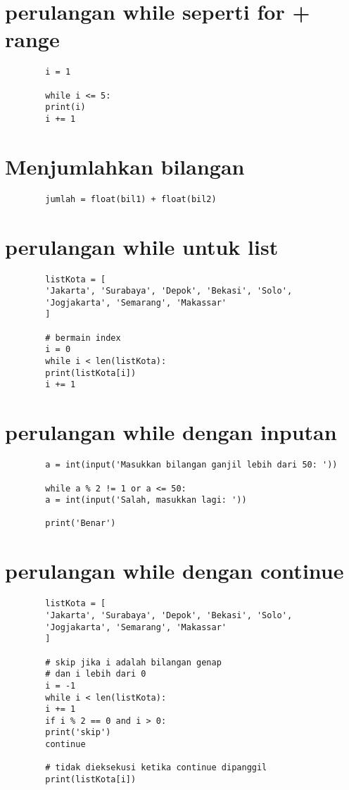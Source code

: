 \documentclass{article}
\begin{document}
	\section {perulangan while seperti for + range}
	\begin{lstlisting}
		i = 1
		
		while i <= 5:
		print(i)
		i += 1
	\end{lstlisting}

	\section {Menjumlahkan bilangan}
	\begin{lstlisting}
		jumlah = float(bil1) + float(bil2)
	\end{lstlisting}
	
	\section {perulangan while untuk list}
	\begin{lstlisting}
		listKota = [
		'Jakarta', 'Surabaya', 'Depok', 'Bekasi', 'Solo',
		'Jogjakarta', 'Semarang', 'Makassar'
		]
		
		# bermain index
		i = 0
		while i < len(listKota):
		print(listKota[i])
		i += 1
	\end{lstlisting}

	\section {perulangan while dengan inputan}
	\begin{lstlisting}
		a = int(input('Masukkan bilangan ganjil lebih dari 50: '))
		
		while a % 2 != 1 or a <= 50:
		a = int(input('Salah, masukkan lagi: '))
		
		print('Benar')
	\end{lstlisting}

	\section {perulangan while dengan continue}
	\begin{lstlisting}
		listKota = [
		'Jakarta', 'Surabaya', 'Depok', 'Bekasi', 'Solo',
		'Jogjakarta', 'Semarang', 'Makassar'
		]
		
		# skip jika i adalah bilangan genap
		# dan i lebih dari 0
		i = -1
		while i < len(listKota):
		i += 1
		if i % 2 == 0 and i > 0:
		print('skip')
		continue
		
		# tidak dieksekusi ketika continue dipanggil
		print(listKota[i])
	\end{lstlisting}
\end{document}
